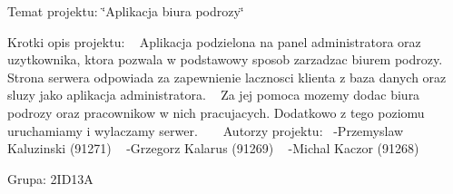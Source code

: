 Temat projektu\+: \char`\"{}\+Aplikacja biura podrozy\char`\"{}~\newline
~\newline


Krotki opis projektu\+: ~\newline
 Aplikacja podzielona na panel administratora oraz uzytkownika, ktora pozwala w podstawowy sposob zarzadzac biurem podrozy. ~\newline
 Strona serwera odpowiada za zapewnienie lacznosci klienta z baza danych oraz sluzy jako aplikacja administratora. ~\newline
 Za jej pomoca mozemy dodac biura podrozy oraz pracownikow w nich pracujacych. Dodatkowo z tego poziomu uruchamiamy i wylaczamy serwer. ~\newline
~\newline
 Autorzy projektu\+:~\newline
 -\/Przemyslaw Kaluzinski (91271) ~\newline
 -\/Grzegorz Kalarus (91269) ~\newline
 -\/Michal Kaczor (91268) ~\newline
~\newline


Grupa\+: 2ID13A 